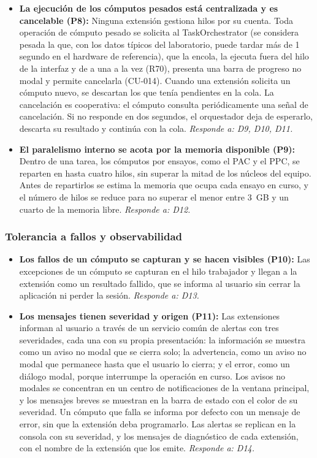 \documentclass[11pt,a4paper]{article}
\DeclareRobustCommand{\_}{\textunderscore\allowbreak}
\begin{document}
\begin{itemize}
    \item \textbf{La ejecución de los cómputos pesados está centralizada y es cancelable (P8):} Ninguna extensión gestiona hilos por su cuenta. Toda operación de cómputo pesado se solicita al TaskOrchestrator (se considera pesada la que, con los datos típicos del laboratorio, puede tardar más de 1 segundo en el hardware de referencia), que la encola, la ejecuta fuera del hilo de la interfaz y de a una a la vez (R70), presenta una barra de progreso no modal y permite cancelarla (CU-014). Cuando una extensión solicita un cómputo nuevo, se descartan los que tenía pendientes en la cola. La cancelación es cooperativa: el cómputo consulta periódicamente una señal de cancelación. Si no responde en dos segundos, el orquestador deja de esperarlo, descarta su resultado y continúa con la cola. \textit{Responde a: D9, D10, D11.}
    \item \textbf{El paralelismo interno se acota por la memoria disponible (P9):} Dentro de una tarea, los cómputos por ensayos, como el PAC y el PPC, se reparten en hasta cuatro hilos, sin superar la mitad de los núcleos del equipo. Antes de repartirlos se estima la memoria que ocupa cada ensayo en curso, y el número de hilos se reduce para no superar el menor entre 3~GB y un cuarto de la memoria libre. \textit{Responde a: D12.}
\end{itemize}

\subsubsection{Tolerancia a fallos y observabilidad}
\begin{itemize}
    \item \textbf{Los fallos de un cómputo se capturan y se hacen visibles (P10):} Las excepciones de un cómputo se capturan en el hilo trabajador y llegan a la extensión como un resultado fallido, que se informa al usuario sin cerrar la aplicación ni perder la sesión. \textit{Responde a: D13.}
    \item \textbf{Los mensajes tienen severidad y origen (P11):} Las extensiones informan al usuario a través de un servicio común de alertas con tres severidades, cada una con su propia presentación: la información se muestra como un aviso no modal que se cierra solo; la advertencia, como un aviso no modal que permanece hasta que el usuario lo cierra; y el error, como un diálogo modal, porque interrumpe la operación en curso. Los avisos no modales se concentran en un centro de notificaciones de la ventana principal, y los mensajes breves se muestran en la barra de estado con el color de su severidad. Un cómputo que falla se informa por defecto con un mensaje de error, sin que la extensión deba programarlo. Las alertas se replican en la consola con su severidad, y los mensajes de diagnóstico de cada extensión, con el nombre de la extensión que los emite. \textit{Responde a: D14.}
\end{itemize}
\end{document}
